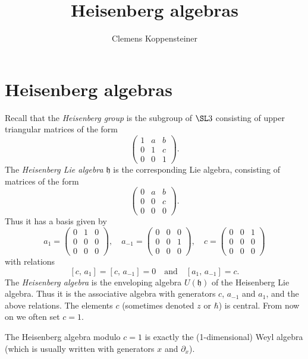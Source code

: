 \documentclass{ck-article}
\title{Heisenberg algebras}
\author{Clemens Koppensteiner}
\begin{document}
\maketitle

\section{Heisenberg algebras}

Recall that the \emph{Heisenberg group} is the subgroup of $\SL 3$ consisting of upper triangular matrices of the form
\[
    \begin{pmatrix}
        1 & a & b \\
        0 & 1 & c \\
        0 & 0 & 1
    \end{pmatrix}.
\]
The \emph{Heisenberg Lie algebra} $\mathfrak{h}$ is the corresponding Lie algebra, consisting of matrices of the form
\[
    \begin{pmatrix}
        0 & a & b \\
        0 & 0 & c \\
        0 & 0 & 0
    \end{pmatrix}.
\]
Thus it has a basis given by
\[
    a_1 = 
    \begin{pmatrix}
        0 & 1 & 0 \\
        0 & 0 & 0 \\
        0 & 0 & 0
    \end{pmatrix}, \quad
    a_{-1} = 
    \begin{pmatrix}
        0 & 0 & 0 \\
        0 & 0 & 1 \\
        0 & 0 & 0
    \end{pmatrix}, \quad
    c = 
    \begin{pmatrix}
        0 & 0 & 1 \\
        0 & 0 & 0 \\
        0 & 0 & 0
    \end{pmatrix}
\]
with relations
\[
    [c,\, a_1] = [c,\, a_{-1}] = 0 \quad\text{and}\quad [a_1,\, a_{-1}] = c.
\]
The \emph{Heisenberg algebra} is the enveloping algebra $U(\mathfrak{h})$ of the Heisenberg Lie algebra.
Thus it is the associative algebra with generators $c$, $a_{-1}$ and $a_1$, and the above relations.
The elements $c$ (sometimes denoted $z$ or $\hbar$) is central.
From now on we often set $c = 1$.

\begin{Remark}
    The Heisenberg algebra modulo $c = 1$ is exactly the (1-dimensional) Weyl algebra (which is usually written with generators $x$ and $\partial_x$).
\end{Remark}
\end{document}
